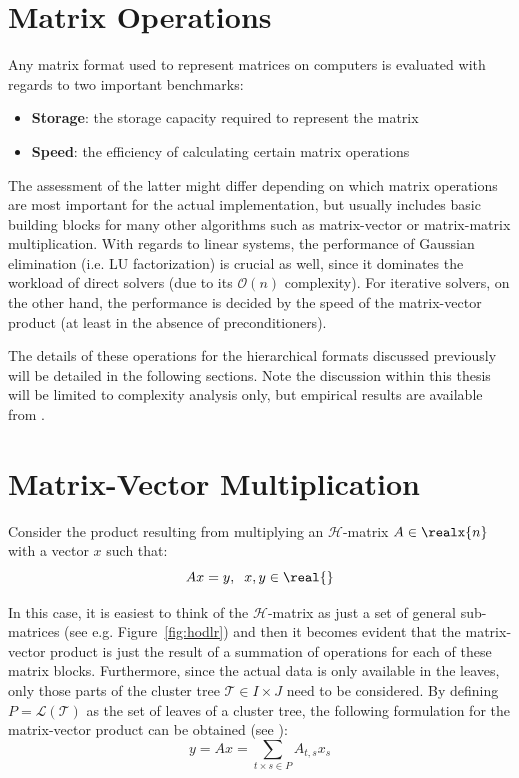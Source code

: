 \section{Matrix Operations}
\label{sec:matrix_operations}

Any matrix format used to represent matrices on computers is evaluated with regards to two important benchmarks:
\begin{itemize}
    \item \textbf{Storage}: the storage capacity required to represent the matrix
    \item \textbf{Speed}: the efficiency of calculating certain matrix operations
\end{itemize}

The assessment of the latter might differ depending on which matrix operations are most important for the actual implementation, but usually includes basic building blocks for many other algorithms such as matrix-vector or matrix-matrix multiplication. With regards to linear systems, the performance of Gaussian elimination (i.e. LU factorization) is crucial as well, since it dominates the workload of direct solvers (due to its $\mathcal{O}(n)$ complexity). For iterative solvers, on the other hand, the performance is decided by the speed of the matrix-vector product (at least in the absence of preconditioners).

The details of these operations for the hierarchical formats discussed previously will be detailed in the following sections. Note the discussion within this thesis will be limited to complexity analysis only, but empirical results are available from \cite{spalthoff_pg_hierarchical_2020}.


\section{Matrix-Vector Multiplication}
\label{sec:matrix_vector}

Consider the product resulting from multiplying an  $\mathcal{H}$-matrix $A \in \realx{n}$ with a vector $x$ such that:
\begin{equation}
    Ax = y, \; \; x,y \in \real{}
\end{equation}

\noindent In this case, it is easiest to think of the $\mathcal{H}$-matrix as just a set of general sub-matrices (see e.g. Figure~\hyperref[fig:hodlr]{\ref{fig:hodlr}}) and then it becomes evident that the matrix-vector product is just the result of a summation of operations for each of these matrix blocks. Furthermore, since the actual data is only available in the leaves, only those parts of the cluster tree $\mathcal{T} \in I \times J$ need to be considered. By defining $P = \mathcal{L}(\mathcal{T})$ as the set of leaves of a cluster tree, the following formulation for the matrix-vector product can be obtained (see  \cite{bebendorf_hierarchical_2008}):
\begin{equation}
    y=Ax = \sum_{t \times s \in P}{A_{t,s}x_s}
\end{equation}


